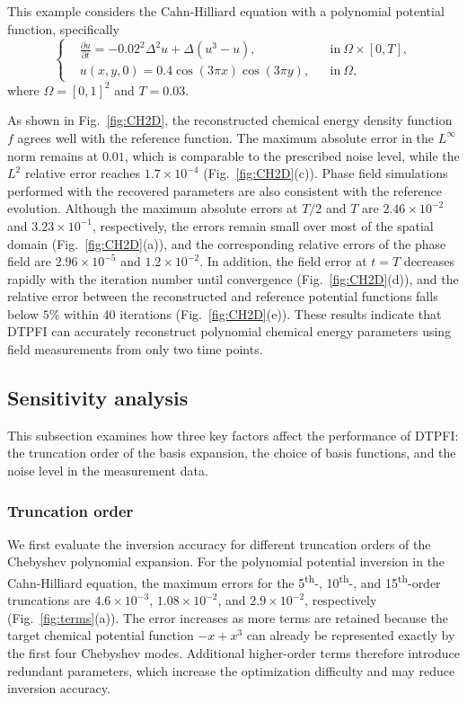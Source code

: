 \documentclass[11pt,reqno]{amsart}
\begin{document}
This example considers the Cahn-Hilliard equation with a polynomial potential function, specifically
\begin{equation}
    \left\{
    \begin{aligned}
        &\frac{\partial u}{\partial t} = -0.02^2\Delta^2 u + \Delta (u^3 - u), &&\text{in}\ \Omega\times [0,T],\\
        &u(x,y,0) = 0.4\cos(3\pi x)\cos(3\pi y), &&\text{in}\ \Omega,
    \end{aligned}
    \right.
\end{equation}
where $\Omega = [0,1]^2$ and $T = 0.03$. 

As shown in Fig.~\ref{fig:CH2D}, the reconstructed chemical energy density function $f$ agrees well with the reference function. The maximum absolute error in the $L^{\infty}$ norm remains at $0.01$, which is comparable to the prescribed noise level, while the $L^2$ relative error reaches $1.7\times10^{-4}$ (Fig.~\ref{fig:CH2D}(c)). Phase field simulations performed with the recovered parameters are also consistent with the reference evolution. Although the maximum absolute errors at $T/2$ and $T$ are $2.46\times10^{-2}$ and $3.23\times10^{-1}$, respectively, the errors remain small over most of the spatial domain (Fig.~\ref{fig:CH2D}(a)), and the corresponding relative errors of the phase field are $2.96\times10^{-5}$ and $1.2\times10^{-2}$. In addition, the field error at $t=T$ decreases rapidly with the iteration number until convergence (Fig.~\ref{fig:CH2D}(d)), and the relative error between the reconstructed and reference potential functions falls below $5\%$ within 40 iterations (Fig.~\ref{fig:CH2D}(e)). These results indicate that DTPFI can accurately reconstruct polynomial chemical energy parameters using field measurements from only two time points.

\subsection{Sensitivity analysis}
This subsection examines how three key factors affect the performance of DTPFI: the truncation order of the basis expansion, the choice of basis functions, and the noise level in the measurement data.

\subsubsection{Truncation order}
We first evaluate the inversion accuracy for different truncation orders of the Chebyshev polynomial expansion. For the polynomial potential inversion in the Cahn-Hilliard equation, the maximum errors for the 5\textsuperscript{th}-, 10\textsuperscript{th}-, and 15\textsuperscript{th}-order truncations are $4.6\times10^{-3}$, $1.08\times10^{-2}$, and $2.9\times10^{-2}$, respectively (Fig.~\ref{fig:terms}(a)). The error increases as more terms are retained because the target chemical potential function $-x+x^3$ can already be represented exactly by the first four Chebyshev modes. Additional higher-order terms therefore introduce redundant parameters, which increase the optimization difficulty and may reduce inversion accuracy.
\end{document}
